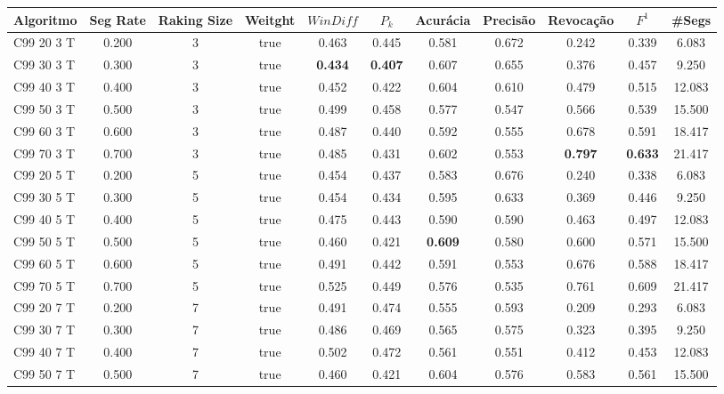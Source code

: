 \documentclass{article}
\begin{document}
\begin{longtable}[c]{|l|c|c|c|c|c|c|c|c|c|c|} 
\hline 
Algoritmo & Seg Rate & Raking Size & Weitght & $WinDiff$ & $P_k$ & Acurácia & Precisão & Revocação & $F^1$ & \#Segs\\ \hline 
C99 20  3 T & 0.200 & 3 & true & 0.463 & 0.445 & 0.581 & 0.672 & 0.242 & 0.339 & 6.083  \\ \hline 
 C99 30  3 T & 0.300 & 3 & true & \cellcolor{gray!20} \textbf{0.434} & \cellcolor{gray!20} \textbf{0.407} & 0.607 & 0.655 & 0.376 & 0.457 & 9.250  \\ \hline 
 C99 40  3 T & 0.400 & 3 & true & 0.452 & 0.422 & 0.604 & 0.610 & 0.479 & 0.515 & 12.083  \\ \hline 
 C99 50  3 T & 0.500 & 3 & true & 0.499 & 0.458 & 0.577 & 0.547 & 0.566 & 0.539 & 15.500  \\ \hline 
 C99 60  3 T & 0.600 & 3 & true & 0.487 & 0.440 & 0.592 & 0.555 & 0.678 & 0.591 & 18.417  \\ \hline 
 C99 70  3 T & 0.700 & 3 & true & 0.485 & 0.431 & 0.602 & 0.553 & \cellcolor{gray!20} \textbf{0.797} & \cellcolor{gray!20} \textbf{0.633} & 21.417  \\ \hline 
 C99 20  5 T & 0.200 & 5 & true & 0.454 & 0.437 & 0.583 & 0.676 & 0.240 & 0.338 & 6.083  \\ \hline 
 C99 30  5 T & 0.300 & 5 & true & 0.454 & 0.434 & 0.595 & 0.633 & 0.369 & 0.446 & 9.250  \\ \hline 
 C99 40  5 T & 0.400 & 5 & true & 0.475 & 0.443 & 0.590 & 0.590 & 0.463 & 0.497 & 12.083  \\ \hline 
 C99 50  5 T & 0.500 & 5 & true & 0.460 & 0.421 & \cellcolor{gray!20} \textbf{0.609} & 0.580 & 0.600 & 0.571 & 15.500  \\ \hline 
 C99 60  5 T & 0.600 & 5 & true & 0.491 & 0.442 & 0.591 & 0.553 & 0.676 & 0.588 & 18.417  \\ \hline 
 C99 70  5 T & 0.700 & 5 & true & 0.525 & 0.449 & 0.576 & 0.535 & 0.761 & 0.609 & 21.417  \\ \hline 
 C99 20  7 T & 0.200 & 7 & true & 0.491 & 0.474 & 0.555 & 0.593 & 0.209 & 0.293 & 6.083  \\ \hline 
 C99 30  7 T & 0.300 & 7 & true & 0.486 & 0.469 & 0.565 & 0.575 & 0.323 & 0.395 & 9.250  \\ \hline 
 C99 40  7 T & 0.400 & 7 & true & 0.502 & 0.472 & 0.561 & 0.551 & 0.412 & 0.453 & 12.083  \\ \hline 
 C99 50  7 T & 0.500 & 7 & true & 0.460 & 0.421 & 0.604 & 0.576 & 0.583 & 0.561 & 15.500  \\ \hline 

\end{longtable}
\end{document}
